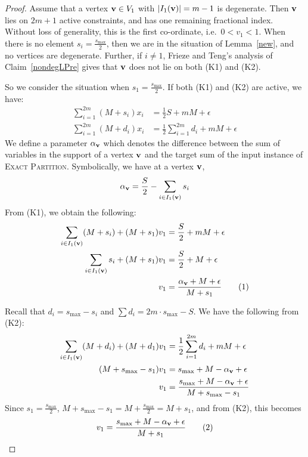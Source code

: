 \documentclass[3p, twocolumn]{elsarticle}
\def\ve#1{\mathchoice{\mbox{\boldmath$\displaystyle\bf#1$}}
{\mbox{\boldmath$\textstyle\bf#1$}}
{\mbox{\boldmath$\scriptstyle\bf#1$}}
{\mbox{\boldmath$\scriptscriptstyle\bf#1$}}}
\begin{document}
\begin{proof}


Assume that a vertex $\ve{v} \in V_1$ with $|I_1(\ve{v})| = m-1$ is degenerate.  Then $\ve{v}$  %
lies on $2m+1$ active constraints, and has one remaining fractional index.  Without loss of generality, this is the first co-ordinate, i.e.~$0< v_1<1$. 
When there is no element $s_i = \frac{s_{\max}}{2}$, then we are in the situation of Lemma~\ref{new}, and no vertices are degenerate. Further, if $i \ne 1$, Frieze and Teng's analysis of Claim~\ref{nondegLPre} gives that $\ve{v}$ does not lie on both (K1) and (K2).  

So we consider the situation when $s_1 = \frac{s_{\max}}{2}$. 
If both (K1) and (K2) are active, we have: 
\begin{align*}
    \sum_{i=1}^{2m} (M + s_i) x_i &= \frac{1}{2}S + mM + \epsilon \tag{K1}\\ 
\sum_{i=1}^{2m} (M + d_i)x_i &= \frac{1}{2} \sum_{i=1}^{2m} d_i + mM + \epsilon \tag{K2}
\end{align*}
We define a parameter $\alpha_{\ve{v}}$ which denotes the difference between the sum of variables in the support of a vertex $\ve{v}$ and the target sum of the input instance of \textsc{Exact Partition}. Symbolically, we have at a vertex $\ve{v}$, $$\displaystyle \alpha_{\ve{v}} = \frac{S}{2} - \sum_{i \in I_1(\ve{v})}s_i$$
From (K1), we obtain the following:
        \begin{align*}
            \sum_{i \in I_1(\ve{v})}(M+s_i) + (M+s_1)v_1 &= \frac{S}{2} + mM + \epsilon \\
            \sum_{i \in I_1(\ve{v})}s_i + (M+s_1)v_1 &= \frac{S}{2} + M + \epsilon \\
            v_1 &= \frac{\alpha_{\ve{v}} + M + \epsilon}{M+s_1} \text{\tag{1}}
        \end{align*}

Recall that $d_i = s_{\max}-s_i$ and $\sum d_i = 2m \cdot s_{\max} - S$. We have the following from (K2):
        \begin{align*}
           \sum_{i \in I_1(\ve{v})}(M+d_i) + (M+d_1)v_1 &= \frac{1}{2}\sum_{i=1}^{2m} d_i + mM + \epsilon \\
           (M+s_{\max}-s_1)v_1 &= s_{\max} + M - \alpha_{\ve{v}} + \epsilon\\
           v_1 &= \frac{s_{\max} + M - \alpha_{\ve{v}} + \epsilon}{M + s_{\max} -s_1}
        \end{align*}
Since $s_1 = \frac{s_{\max}}{2}$, $M+s_{\max}-s_1 = M + \frac{s_{\max}}{2} = M+s_1$, and from (K2), this becomes
\begin{align*}
    v_1 = \frac{s_{\max} + M - \alpha_{\ve{v}} + \epsilon}{M + s_1}\tag{2}
\end{align*}


\end{proof}
\end{document}
